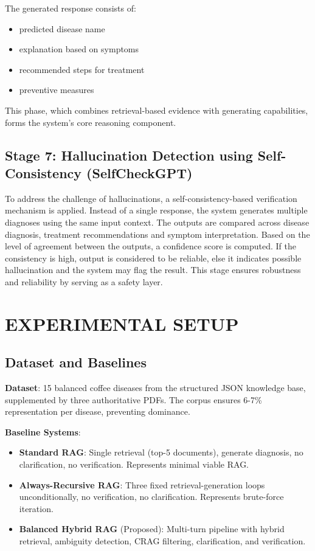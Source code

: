 \documentclass[conference]{IEEEtran}
\begin{document}
The generated response consists of:

\begin{itemize}
    \item predicted disease name
    \item explanation based on symptoms
    \item recommended steps for treatment
    \item preventive measures
\end{itemize}
This phase, which combines retrieval-based evidence with generating capabilities, forms the system's core reasoning component.

\subsection{Stage 7: Hallucination Detection using Self-Consistency (SelfCheckGPT)}

To address the challenge of hallucinations, a self-consistency-based verification mechanism is applied. Instead of a single response, the system generates multiple diagnoses using the same input context. The outputs are compared across disease diagnosis, treatment recommendations and symptom interpretation.
Based on the level of agreement between the outputs, a confidence score is computed. If the consistency is high, output is considered to be reliable, else it indicates possible hallucination and the system may flag the result. 
This stage ensures robustness and reliability by serving as a safety layer.

\section{EXPERIMENTAL SETUP}

\subsection{Dataset and Baselines}

\textbf{Dataset}: 15 balanced coffee diseases from the structured JSON knowledge base, supplemented by three authoritative PDFs. The corpus ensures 6-7\% representation per disease, preventing dominance.

\textbf{Baseline Systems}:
\begin{itemize}
    \item \textbf{Standard RAG}: Single retrieval (top-5 documents), generate diagnosis, no clarification, no verification. Represents minimal viable RAG.
    \item \textbf{Always-Recursive RAG}: Three fixed retrieval-generation loops unconditionally, no verification, no clarification. Represents brute-force iteration.
    \item \textbf{Balanced Hybrid RAG} (Proposed): Multi-turn pipeline with hybrid retrieval, ambiguity detection, CRAG filtering, clarification, and verification.
\end{itemize}
\end{document}
